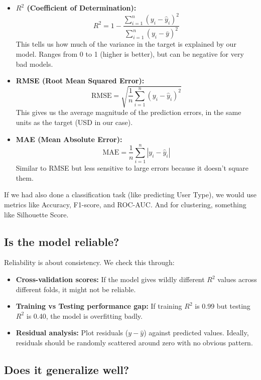 \documentclass[12pt, a4paper]{article}
\begin{document}
\begin{itemize}
    \item \textbf{$R^2$ (Coefficient of Determination):} 
    $$R^2 = 1 - \frac{\sum_{i=1}^{n}(y_i - \hat{y}_i)^2}{\sum_{i=1}^{n}(y_i - \bar{y})^2}$$
    This tells us how much of the variance in the target is explained by our model. Ranges from 0 to 1 (higher is better), but can be negative for very bad models.
    
    \item \textbf{RMSE (Root Mean Squared Error):}
    $$\text{RMSE} = \sqrt{\frac{1}{n} \sum_{i=1}^{n}(y_i - \hat{y}_i)^2}$$
    This gives us the average magnitude of the prediction errors, in the same units as the target (USD in our case).
    
    \item \textbf{MAE (Mean Absolute Error):}
    $$\text{MAE} = \frac{1}{n} \sum_{i=1}^{n} |y_i - \hat{y}_i|$$
    Similar to RMSE but less sensitive to large errors because it doesn't square them.
\end{itemize}

If we had also done a classification task (like predicting User Type), we would use metrics like Accuracy, F1-score, and ROC-AUC. And for clustering, something like Silhouette Score.

\subsection{Is the model reliable?}

Reliability is about consistency. We check this through:
\begin{itemize}
    \item \textbf{Cross-validation scores:} If the model gives wildly different $R^2$ values across different folds, it might not be reliable.
    \item \textbf{Training vs Testing performance gap:} If training $R^2$ is 0.99 but testing $R^2$ is 0.40, the model is overfitting badly.
    \item \textbf{Residual analysis:} Plot residuals ($y - \hat{y}$) against predicted values. Ideally, residuals should be randomly scattered around zero with no obvious pattern.
\end{itemize}

\subsection{Does it generalize well?}
\end{document}
